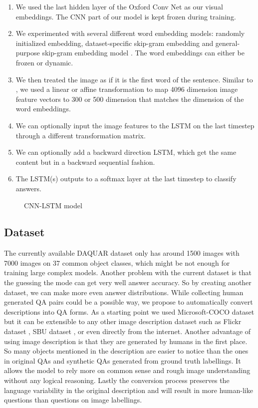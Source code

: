 \documentclass{article}
\renewcommand{\#}[1]{\textbf{#1}}
\begin{document}
\begin{enumerate}
    \item We used the last hidden layer of the Oxford Conv Net \cite{simonyan14} as our visual embeddings. The CNN part of our model is kept frozen during training.
    \item We experimented with several different word embedding models: randomly initialized embedding, dataset-specific skip-gram embedding and general-purpose skip-gram embedding model \cite{mikolov13}. The word embeddings can either be frozen or dynamic.
    \item We then treated the image as if it is the first word of the sentence. Similar to \cite{frome13}, we used a linear or affine transformation to map 4096 dimension image feature vectors to 300 or 500 dimension that matches the dimension of the word embeddings.
    \item We can optionally input the image features to the LSTM on the last timestep through a different transformation matrix.
    \item We can optionally add a backward direction LSTM, which get the same content but in a backward sequential fashion.
    \item The LSTM(s) outputs to a softmax layer at the last timestep to classify answers.
\end{enumerate}

\begin{figure}
\centering
\scalebox{0.7}{
}
\caption{CNN-LSTM model}
\label{fig:imgword}
\end{figure}

\subsection{Dataset}
The currently available DAQUAR dataset only has around 1500 images with 7000 images on 37 common object classes, which might be not enough for training large complex models. Another problem with the current dataset is that the guessing the mode can get very well answer accuracy. So by creating another dataset, we can make more even answer distributions. While collecting human generated QA pairs could be a possible way, we propose to automatically convert descriptions into QA forms. As a starting point we used Microsoft-COCO dataset \cite{mscoco} but it can be extensible to any other image description dataset such as Flickr dataset \cite{flickr8k}, SBU dataset \cite{ordonez11}, or even directly from the internet. Another advantage of using image description is that they are generated by humans in the first place. So many objects mentioned in the description are easier to notice than the ones in original QAs and synthetic QAs generated from ground truth labellings. It allows the model to rely more on common sense and rough image understanding without any logical reasoning. Lastly the conversion process preserves the language variability in the original description and will result in more human-like questions than questions on image labellings.
\end{document}
